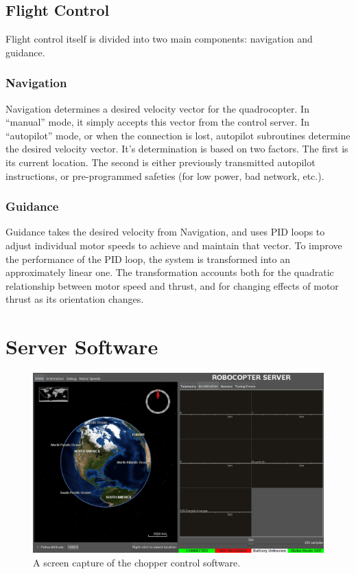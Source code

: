 \subsection{Flight Control}
Flight control itself is divided into two main components:‭ ‬navigation
and guidance.
	
\subsubsection{Navigation}
Navigation determines a desired velocity vector for the quadrocopter.‭
‬In‭ “‬manual‭” ‬mode,‭ ‬it simply accepts this vector from the control
server.‭ ‬In‭ “‬autopilot‭” ‬mode,‭ ‬or when the connection is lost,‭ ‬autopilot
subroutines determine the desired velocity vector.‭ ‬It's determination
is based on two factors.‭ ‬The first is its current location.‭ ‬The second
is either previously transmitted autopilot instructions,‭ ‬or
pre-programmed safeties‭ (‬for low power,‭ ‬bad network,‭ ‬etc.‭).

\subsubsection{Guidance}
Guidance takes the desired velocity from Navigation,‭ ‬and uses PID
loops to adjust individual motor speeds to achieve and maintain that
vector.‭  ‬To improve the performance of the PID loop,‭ ‬the system is
transformed into an approximately linear one.‭  ‬The transformation
accounts both for the quadratic relationship between motor speed and
thrust,‭ ‬and for changing effects of motor thrust as its orientation
changes.

\section{Server Software}
\begin{figure}[h]
  \centering
  \includegraphics[scale=0.3]{figures/globe-screenshot}
  \caption{A screen capture of the chopper control software.}
  \label{fig:globe}
\end{figure}

